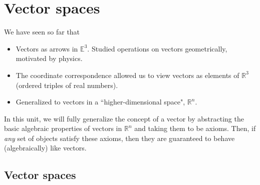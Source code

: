 \documentclass[12pt,letterpaper,reqno]{article}
\numberwithin{equation}{section}
\newcommand{\fixme}[1]{{\color{orange}{[#1]}}}
\begin{document}
\section{Vector spaces}
We have seen so far that
\begin{itemize}
	\item Vectors as arrows in $\mathbb{E}^3$. Studied operations on vectors geometrically, motivated by physics.
	\item The coordinate correspondence allowed us to view vectors as elements of $\mathbb{R}^3$ (ordered triples of real numbers).
	\item Generalized to  vectors in a ``higher-dimensional space", $\mathbb{R}^n$.
\end{itemize}
In this unit, we will fully generalize the concept of a vector by abstracting the basic algebraic properties of vectors in $\mathbb{R}^n$ and taking them to be axioms. Then, if \emph{any} set of objects satisfy these axioms, then they are guaranteed to behave (algebraically) like vectors. \fixme{Needs better introduction.}
\subsection{Vector spaces}
\end{document}
